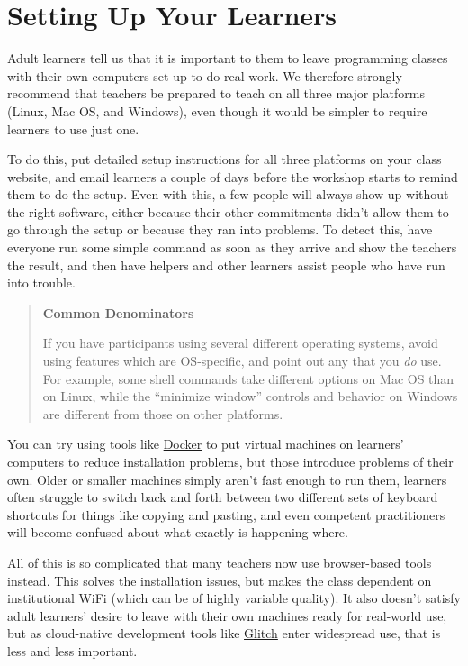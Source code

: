 \section{Setting Up Your Learners}\label{s:classroom-setup}

Adult learners tell us that it is important to them to leave programming
classes with their own computers set up to do real work. We therefore
strongly recommend that teachers be prepared to teach on all three major
platforms (Linux, Mac OS, and Windows), even though it would be simpler
to require learners to use just one.

To do this, put detailed setup instructions for all three platforms on
your class website, and email learners a couple of days before the
workshop starts to remind them to do the setup. Even with this, a few
people will always show up without the right software, either because
their other commitments didn't allow them to go through the setup or
because they ran into problems. To detect this, have everyone run some
simple command as soon as they arrive and show the teachers the result,
and then have helpers and other learners assist people who have run into
trouble.

\begin{quote}\setlength{\parindent}{0pt}
\textbf{Common Denominators}

If you have participants using several different operating systems,
avoid using features which are OS-specific, and point out any that you
\emph{do} use. For example, some shell commands take different options on
Mac OS than on Linux, while the ``minimize window'' controls and
behavior on Windows are different from those on other platforms.
\end{quote}

You can try using tools like \href{http://docker.com}{Docker} to put virtual machines
on learners' computers to reduce installation problems, but those
introduce problems of their own. Older or smaller machines simply
aren't fast enough to run them, learners often struggle to switch back
and forth between two different sets of keyboard shortcuts for things
like copying and pasting, and even competent practitioners will become
confused about what exactly is happening where.

All of this is so complicated that many teachers now use browser-based
tools instead. This solves the installation issues, but makes the
class dependent on institutional WiFi (which can be of highly variable
quality). It also doesn't satisfy adult learners' desire to leave with
their own machines ready for real-world use, but as cloud-native
development tools like \href{https://glitch.com/}{Glitch} enter widespread use, that is
less and less important.

